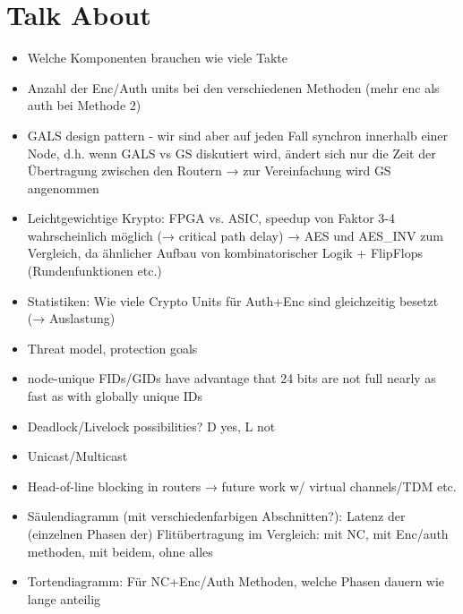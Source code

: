\documentclass[
	paper=a4,
	fontsize=11pt,
	parskip=full %
]{scrreprt}
\begin{document}
    \chapter{Talk About}
    \begin{itemize}
        \item Welche Komponenten brauchen wie viele Takte
        \item Anzahl der Enc/Auth units bei den verschiedenen Methoden (mehr enc als auth bei Methode 2)
        \item GALS design pattern - wir sind aber auf jeden Fall synchron innerhalb einer Node, d.h. wenn GALS vs GS diskutiert wird,
            ändert sich nur die Zeit der Übertragung zwischen den Routern → zur Vereinfachung wird GS angenommen
        \item Leichtgewichtige Krypto: FPGA vs. ASIC, speedup von Faktor 3-4 wahrscheinlich möglich (→ critical path delay) \cite{kuon07fpgavsasic}
            → AES und AES\_INV zum Vergleich, da ähnlicher Aufbau von kombinatorischer Logik + FlipFlops (Rundenfunktionen etc.)
        \item Statistiken: Wie viele Crypto Units für Auth+Enc sind gleichzeitig besetzt (→ Auslastung)
        \item Threat model, protection goals
        \item node-unique FIDs/GIDs have advantage that 24 bits are not full nearly as fast as with globally unique IDs
        \item Deadlock/Livelock possibilities? D yes, L not
        \item Unicast/Multicast
        \item Head-of-line blocking in routers → future work w/ virtual channels/TDM etc.
        \item Säulendiagramm (mit verschiedenfarbigen Abschnitten?): Latenz der (einzelnen Phasen der) Flitübertragung im Vergleich: mit NC, mit
            Enc/auth methoden, mit beidem, ohne alles
        \item Tortendiagramm: Für NC+Enc/Auth Methoden, welche Phasen dauern wie lange anteilig
    \end{itemize}
\end{document}
